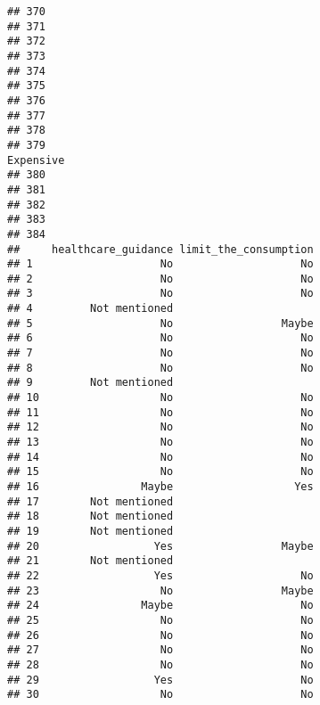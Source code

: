 \documentclass[
]{article}
\begin{document}
\begin{verbatim}
## 370                                                                    
## 371                                                                    
## 372                                                                    
## 373                                                                    
## 374                                                                    
## 375                                                                    
## 376                                                                    
## 377                                                                    
## 378                                                                    
## 379                                                          Expensive 
## 380                                                                    
## 381                                                                    
## 382                                                                    
## 383                                                                    
## 384                                                                    
##     healthcare_guidance limit_the_consumption
## 1                    No                    No
## 2                    No                    No
## 3                    No                    No
## 4         Not mentioned                      
## 5                    No                 Maybe
## 6                    No                    No
## 7                    No                    No
## 8                    No                    No
## 9         Not mentioned                      
## 10                   No                    No
## 11                   No                    No
## 12                   No                    No
## 13                   No                    No
## 14                   No                    No
## 15                   No                    No
## 16                Maybe                   Yes
## 17        Not mentioned                      
## 18        Not mentioned                      
## 19        Not mentioned                      
## 20                  Yes                 Maybe
## 21        Not mentioned                      
## 22                  Yes                    No
## 23                   No                 Maybe
## 24                Maybe                    No
## 25                   No                    No
## 26                   No                    No
## 27                   No                    No
## 28                   No                    No
## 29                  Yes                    No
## 30                   No                    No

\end{verbatim}
\end{document}
